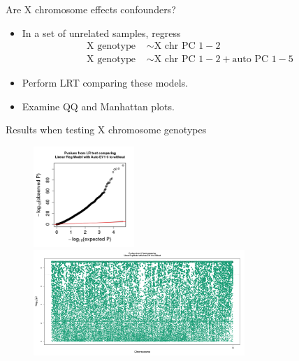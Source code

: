 \documentclass{beamer}
\begin{document}
\begin{frame}{Are X chromosome effects confounders?}
\begin{itemize}
\item In a set of unrelated samples, regress 
\begin{align*}
\mbox{X genotype }&\sim \mbox{X chr PC }1-2\\
\mbox{X genotype }&\sim \mbox{X chr PC }1-2 + \mbox{auto PC }1-5
\end{align*}
\item Perform LRT comparing these models.
\item Examine QQ and Manhattan plots.
\end{itemize}
\end{frame}


\begin{frame}{Results when testing X chromosome genotypes}
\begin{figure}
\includegraphics[height=3.8cm]{../olga_update_27july2015/qqPlot_xSNPs.png}
\includegraphics[width=8cm]{../olga_update_27july2015/manhPlot_xSNPs.png}
\end{figure}
\end{frame}
\end{document}
